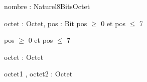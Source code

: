 \begin{algorithme}
        
        {nombre : Naturel8Bits}{Octet}
        {}

        {octet : Octet, pos : \naturelNonNul}{Bit}
        {pos $\geq$ 0 et pos $\leq$ 7}
    
        {
        }
        {pos $\geq$ 0 et pos $\leq$ 7}
    
        {octet : Octet}{\naturel}
        {}
    
        {octet1 , octet2 : Octet}{\booleen}
        {}

\end{algorithme}
 
